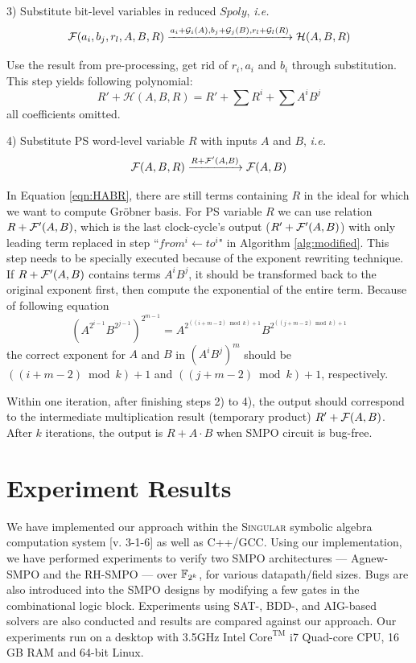 3) Substitute bit-level variables in reduced $Spoly$, {\it i.e.} 
$${\mathcal{F}}(a_i,b_j,r_l,A,B,R) \xrightarrow{a_i+\mathcal{G}_i(A),b_j+\mathcal{G}_j(B),r_l+\mathcal{G}_l(R)} \mathcal{H}(A,B,R)$$

Use the result from pre-processing, get rid of $r_i, a_i$ and $b_i$ through substitution. This step yields following polynomial:
\begin{equation}
\label{eqn:HABR}
R'+ \mathcal{H}(A,B,R) = R' + \sum R^i + \sum A^iB^j
\end{equation}
all coefficients omitted.

4) Substitute PS word-level variable $R$ with inputs $A$ and $B$, {\it i.e.} 
$${\mathcal{F}}(A,B,R) \xrightarrow{R+{\mathcal{F}}'(A,B)} {\mathcal{F}}(A,B)$$

In Equation \ref{eqn:HABR}, there are still terms containing $R$ in the ideal for which we want to compute Gr\"obner basis.
For PS variable $R$ we can use relation $R+{\mathcal{F}}'(A,B)$, which is the last clock-cycle's output ($R'+{\mathcal{F}}'(A,B)$) 
with only leading term replaced in step ``$from^i\gets to^i$" in 
Algorithm \ref{alg:modified}. This step needs to be specially executed because of the exponent rewriting technique. 
If $R+{\mathcal{F}}'(A,B)$ contains terms $A^iB^j$, it should be transformed back to the original exponent first,
then compute the exponential of the entire term.
Because of following equation
$$(A^{2^{i-1}}B^{2^{j-1}})^{2^{m-1}} = A^{2^{((i+m-2)\bmod k)+1}}B^{2^{((j+m-2)\bmod k)+1}}$$
the correct exponent for $A$ and $B$ in $(A^iB^j)^m$ should be $((i+m-2)\bmod k)+1$ and $((j+m-2)\bmod k)+1$, respectively.




Within one iteration, after finishing steps 2) to 4), the output should correspond to the intermediate multiplication result (temporary product) 
$R'+{\mathcal{F}}(A,B)$. After $k$ iterations,
the output is $R+A\cdot B$ when SMPO circuit is bug-free.


\section{Experiment Results}
\label{sec:result}

We have implemented our approach within the \textsc{Singular} symbolic
algebra computation system [v. 3-1-6] \cite{DGPS} as well as C++/GCC. Using our
implementation, we have performed experiments to verify two SMPO
architectures --- Agnew-SMPO \cite{agnew1991implementation} and the
RH-SMPO \cite{RHmulti} --- over ${\mathbb{F}}_{2^k}$, for various datapath/field
sizes. Bugs are also introduced into the SMPO designs by modifying a
few gates in the combinational logic block. Experiments using SAT-,
BDD-, and AIG-based solvers are also conducted and results are
compared against our approach.  Our experiments run on a desktop with
3.5GHz Intel $\text{Core}^\text{TM}$ i7 Quad-core CPU, 16 GB RAM and
64-bit Linux.   

